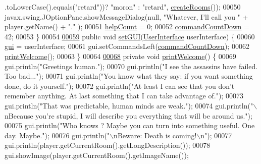 \begin{DoxyCode}
      .toLowerCase().equals(\textcolor{stringliteral}{"retard"}))? \textcolor{stringliteral}{"moron"} : \textcolor{stringliteral}{"retard"}, \hyperlink{classGameEngine_a9410d92f7d0e6820059b1d07da364b09}{createRooms}());
00050         javax.swing.JOptionPane.showMessageDialog(null, \textcolor{stringliteral}{"Whatever, I'll call you "} + player.getName() + \textcolor{stringliteral}{"."}
      );
00051         \hyperlink{classGameEngine_a308a9926d553d53cb4c56c28588f6c62}{helpCount} = 0;
00052         \hyperlink{classGameEngine_ad4ff8d760eced9c7b76cdeb0dc989975}{commandCountDown} = 42;
00053     \}
00054 
\hypertarget{GameEngine_8java_source_l00059}{}\hyperlink{classGameEngine_aec901a5b590b3cd204f196165da5dfb6}{00059}     \textcolor{keyword}{public} \textcolor{keywordtype}{void} \hyperlink{classGameEngine_aec901a5b590b3cd204f196165da5dfb6}{setGUI}(\hyperlink{classUserInterface}{UserInterface} userInterface) \{
00060         \hyperlink{classGameEngine_a2a7d0bb6183b3f3ef3ee2008926374a0}{gui} = userInterface;
00061         gui.setCommandsLeft(\hyperlink{classGameEngine_ad4ff8d760eced9c7b76cdeb0dc989975}{commandCountDown});
00062         \hyperlink{classGameEngine_a9a2f3cb921bb19399e357bf14d26425b}{printWelcome}();
00063     \}
00064 
\hypertarget{GameEngine_8java_source_l00068}{}\hyperlink{classGameEngine_a9a2f3cb921bb19399e357bf14d26425b}{00068}     \textcolor{keyword}{private} \textcolor{keywordtype}{void} \hyperlink{classGameEngine_a9a2f3cb921bb19399e357bf14d26425b}{printWelcome}() \{
00069         gui.println(\textcolor{stringliteral}{"Greetings human."});
00070         gui.println(\textcolor{stringliteral}{"I see the assassins have failed. Too bad..."});
00071         gui.println(\textcolor{stringliteral}{"You know what they say: if you want something done, do it yourself."});
00072         gui.println(\textcolor{stringliteral}{"At least I can see that you don't remember anything. At last something that I can take
       advantage of."});
00073         gui.println(\textcolor{stringliteral}{"That was predictable, human minds are weak."});
00074         gui.println(\textcolor{stringliteral}{"\(\backslash\)nBecause you're stupid, I will describe you everything that will be around us."});
00075         gui.println(\textcolor{stringliteral}{"Who knows ? Maybe you can turn into something useful. One day. Maybe."});
00076         gui.println(\textcolor{stringliteral}{"\(\backslash\)nBeware: Death is coming!\(\backslash\)n"});
00077         gui.println(player.getCurrentRoom().getLongDescription());
00078         gui.showImage(player.getCurrentRoom().getImageName());

\end{DoxyCode}
